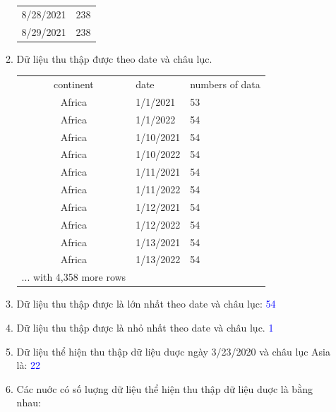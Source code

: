 \documentclass[a4paper]{article}
\theoremstyle{definition}
\begin{document}
\begin{enumerate}[i)]
\begin{enumerate}[1)]
\begin{center}
\begin{tabular}{ c l }
  8/28/2021  &   238    \\
  8/29/2021  &   238    
        \end{tabular}
    \end{center}
    \item Dữ liệu thu thập được theo date và châu lục.
    \begin{center}
      \begin{tabular}{ c l l }
    continent & date & numbers of data      \\
  Africa  &  1/1/2021     & 53 \\
  Africa  &  1/1/2022     & 54 \\
  Africa  &  1/10/2021    & 54 \\
  Africa  &  1/10/2022    & 54 \\
  Africa  &  1/11/2021    & 54 \\
  Africa  &  1/11/2022    & 54 \\
  Africa  &  1/12/2021    & 54 \\
  Africa  &  1/12/2022    & 54 \\
  Africa  &  1/13/2021    & 54 \\
  Africa  &  1/13/2022    & 54 \\
  ... with 4,358 more rows 
        \end{tabular}
    \end{center}
    \item Dữ liệu thu thập được là lớn nhất theo date và châu lục: \textcolor{blue} {54} 
    \item Dữ liệu thu thập được là nhỏ nhất theo date và châu lục. \textcolor{blue} {1} 
    \item Dữ liệu thể hiện thu thập dữ liệu duợc ngày 3/23/2020 và châu lục Asia là: \textcolor{blue} {22} 
    \item Các nuớc có số luợng dữ liệu thể hiện thu thập dữ liệu duợc là bằng nhau: \\
    \textcolor{blue} {
}
\end{enumerate}
\end{enumerate}
\end{document}
